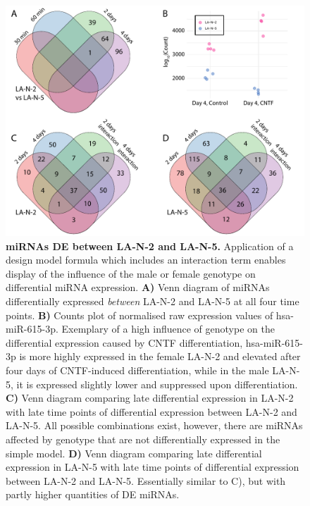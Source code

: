 \begin{figure}
\centering
\includegraphics[width=\textwidth]{figures/la2-vs-la5-overlap-venn}
\caption[miRNAs DE between LA-N-2 and LA-N-5.]{\textbf{miRNAs DE between LA-N-2 and LA-N-5.} Application of a design model formula which includes an interaction term enables display of the influence of the male or female genotype on differential miRNA expression. \textbf{A)} Venn diagram of miRNAs differentially expressed \emph{between} LA-N-2 and LA-N-5 at all four time points. \textbf{B)} Counts plot of normalised raw expression values of hsa-miR-615-3p. Exemplary of a high influence of genotype on the differential expression caused by CNTF differentiation, hsa-miR-615-3p is more highly expressed in the female LA-N-2 and elevated after four days of CNTF-induced differentiation, while in the male LA-N-5, it is expressed slightly lower and suppressed upon differentiation. \textbf{C)} Venn diagram comparing late differential expression in LA-N-2 with late time points of differential expression between LA-N-2 and LA-N-5. All possible combinations exist, however, there are miRNAs affected by genotype that are not differentially expressed in the simple model. \textbf{D)} Venn diagram comparing late differential expression in LA-N-5 with late time points of differential expression between LA-N-2 and LA-N-5. Essentially similar to C), but with partly higher quantities of DE miRNAs.
\label{fig:la2-vs-la5-overlap-venn}}
\end{figure}

